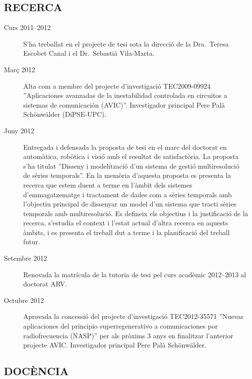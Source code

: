 \subsection*{RECERCA}

\begin{description}

\item[Curs 2011--2012] S'ha treballat en el projecte de tesi sota la
  direcció de la Dra.\ Teresa Escobet Canal i el Dr.\ Sebastià
  Vila-Marta.

\item[Març 2012] Alta com a membre del projecte d'investigació
  TEC2009-09924 ''Aplicaciones avanzadas de la inestabilidad
  controlada en circuitos a sistemas de comunicación
  (AVIC)''. Investigador principal Pere Palà Schönwälder (DiPSE-UPC).

\item[Juny 2012] Entregada i defensada la proposta de tesi en el marc
  del doctorat en automàtica, robòtica i visió amb el resultat de
  satisfactòria. La proposta s'ha titulat ''Disseny i modelització
  d'un sistema de gestió multiresolució de sèries temporals''. En la
  memòria d'aquesta proposta es presenta la recerca que estem duent a
  terme en l'àmbit dels sistemes d'emmagatzematge i tractament de
  dades com a sèries temporals amb l'objectiu principal de dissenyar
  un model d'un sistema que tracti sèries temporals amb
  multiresolució. Es defineix els objectius i la justificació de la
  recerca, s'estudia el context i l'estat actual d'altra recerca en
  aquests àmbits, i es presenta el treball dut a terme i la
  planificació del treball futur.

\item[Setembre 2012] Renovada la matrícula de la tutoria de tesi pel
  curs acadèmic 2012--2013 al doctorat ARV.

\item[Octubre 2012] Aprovada la concessió del projecte d'investigació
  TEC2012-35571 ''Nuevas aplicaciones del principio superregenerativo
  a comunicaciones por radiofrecuencia (NASP)'' per als pròxims 3 anys
  en finalitzar l'anterior projecte AVIC. Investigador principal Pere
  Palà Schönwälder.


\end{description}



\subsection*{DOCÈNCIA}

